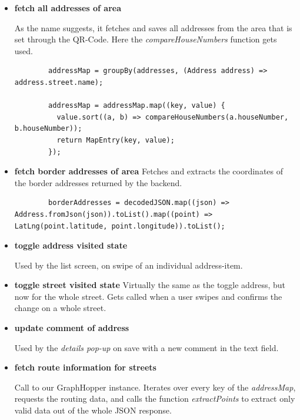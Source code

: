 \begin{itemize}
    \item \textbf{fetch all addresses of area}
    
    As the name suggests, it fetches and saves all addresses from the area that is set through the QR-Code. Here the \textit{compareHouseNumbers} function gets used.

    \lstset{style=generic, caption=use of compareHouseNumbers function (AddressProvider.dart)}
    \begin{lstlisting}
        addressMap = groupBy(addresses, (Address address) => address.street.name);

        addressMap = addressMap.map((key, value) {
          value.sort((a, b) => compareHouseNumbers(a.houseNumber, b.houseNumber));
          return MapEntry(key, value);
        });
    \end{lstlisting}

    \item \textbf{fetch border addresses of area}
    Fetches and extracts the coordinates of the border addresses returned by the backend.

    \lstset{style=generic, caption=extraction of coordinates from border addresses (AddressProvider.dart)}
    \begin{lstlisting}
        borderAddresses = decodedJSON.map((json) => Address.fromJson(json)).toList().map((point) => LatLng(point.latitude, point.longitude)).toList();
    \end{lstlisting}

    \item \textbf{toggle address visited state}
    
    Used by the list screen, on swipe of an individual address-item.

    \item \textbf{toggle street visited state}
    Virtually the same as the toggle address, but now for the whole street. Gets called when a user swipes and confirms the change on a whole street.

    \item \textbf{update comment of address}
    
    Used by the \textit{details pop-up} on save with a new comment in the text field.

    \item \textbf{fetch route information for streets}
    
    Call to our GraphHopper instance. Iterates over every key of the \textit{addressMap}, requests the routing data, and calls the function \textit{extractPoints} to extract only valid data out of the whole JSON response.
\end{itemize}

